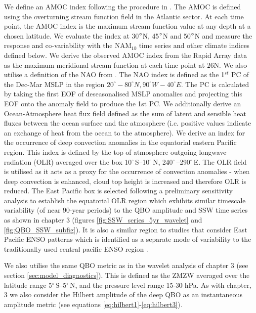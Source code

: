 We define an AMOC index following the procedure in \cite{reichlerStratospheric2012b}. The AMOC is defined using the overturning stream function field in the Atlantic sector. At each time point, the AMOC index is the maximum stream function value at any depth at a chosen latitude. We evaluate the index at 30$\degree$N, 45$\degree$N and 50$\degree$N and measure the response and co-variability with the NAM$_{10}$ time series and other climate indices defined below. We derive the observed AMOC index from the Rapid Array data as the maximum meridional stream function at each time point at 26N. We also utilise a definition of the NAO from \cite{hurrellNorth2003c}. The NAO index is defined as the 1$^{st}$ PC of the Dec-Mar MSLP in the region $20^{\circ}-80^{\circ}N, 90^{\circ}W-40^{\circ}E$. The PC is calculated by taking the first EOF of deseasonalised MSLP anomalies and projecting this EOF onto the anomaly field to produce the 1st PC. We additionally derive an Ocean-Atmosphere heat flux field defined as the sum of latent and sensible heat fluxes between the ocean surface and the atmosphere (i.e. positive values indicate an exchange of heat from the ocean to the atmosphere). We derive an index for the occurrence of deep convection anomalies in the equatorial eastern Pacific region. This index is defined by the top of atmosphere outgoing longwave radiation (OLR) averaged over the box 10$^{\circ}$\,S–10$^{\circ}$\,N, 240$^{\circ}$\,–290$^{\circ}$\,E. The OLR field is utilised as it acts as a proxy for the occurrence of convection anomalies - when deep convection is enhanced, cloud top height is increased and therefore OLR is reduced. The East Pacific box is selected following a preliminary sensitivity analysis to establish the equatorial OLR region which exhibits similar timescale variability (of near 90-year periods) to the QBO amplitude and SSW time series as shown in chapter 3 (figures \ref{fig:SSW_series_5yr_wavelet} and \ref{fig:QBO_SSW_subfig}). It is also a similar region to studies that consider East Pacific ENSO patterns which is identified as a separate mode of variability to the traditionally used central pacific ENSO region \citep{johnsonHow2013f}.

We also utilise the same QBO metric as in the wavelet analysis of chapter 3 (see section \ref{sec:model_diagnostics}). This is defined as the ZMZW averaged over the latitude range 5$^{\circ}$\,S–5$^{\circ}$\,N,  and the pressure level range 15-30 hPa. As with chapter, 3 we also consider the Hilbert amplitude of the deep QBO as an instantaneous amplitude metric (see equations \ref{eq:hilbert1}-\ref{eq:hilbert3}). 

